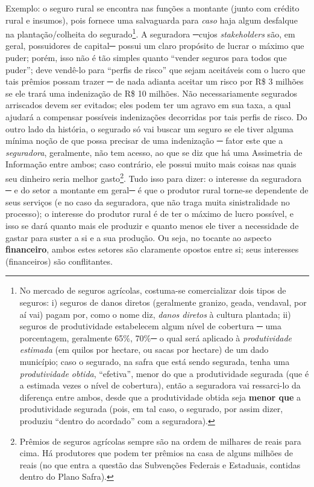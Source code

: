 \documentclass[12pt]{article}
\numberwithin{equation}{section}
\theoremstyle{plain}
\theoremstyle{definition}
\theoremstyle{remark}
\begin{document}
Exemplo: o seguro rural se encontra nas funções a montante (junto com crédito rural e insumos), pois fornece uma salvaguarda para \textit{caso} haja algum desfalque na plantação/colheita do segurado\footnote{No mercado de seguros agrícolas, costuma-se comercializar dois tipos de seguros: i) seguros de danos diretos (geralmente granizo, geada, vendaval, por aí vai) pagam por, como o nome diz, \textit{danos diretos} à cultura plantada; ii) seguros de produtividade estabelecem algum nível de cobertura ─ uma porcentagem, geralmente 65\%, 70\%─ o qual será aplicado à \textit{produtividade estimada} (em quilos por hectare, ou sacas por hectare) de um dado município; caso o segurado, na safra que está sendo segurada, tenha uma \textit{produtividade obtida}, ``efetiva'', menor do que a produtividade segurada (que é a estimada vezes o nível de cobertura), então a seguradora vai ressarci-lo da diferença entre ambos, desde que a produtividade obtida seja \textbf{menor que} a produtividade segurada (pois, em tal caso, o segurado, por assim dizer, produziu ``dentro do acordado'' com a seguradora).}. A seguradora ─cujos \textit{stakeholders} são, em geral, possuidores de capital─ possui um claro propósito de lucrar o máximo que puder; porém, isso não é tão simples quanto ``vender seguros para todos que puder''; deve vendê-lo para ``perfis de risco'' que sejam aceitáveis com o lucro que tais prêmios possam trazer ─ de nada adianta aceitar um risco por R\$ 3 milhões se ele trará uma indenização de R\$ 10 milhões. Não necessariamente segurados arriscados devem ser evitados; eles podem ter um agravo em sua taxa, a qual ajudará a compensar possíveis indenizações decorridas por tais perfis de risco. Do outro lado da história, o segurado só vai buscar um seguro se ele tiver alguma mínima noção de que possa precisar de uma indenização ─ fator este que a \textit{seguradora}, geralmente, não tem acesso, ao que se diz que há uma Assimetria de Informação entre ambos; caso contrário, ele possui muito mais coisas nas quais seu dinheiro seria melhor gasto\footnote{Prêmios de seguros agrícolas sempre são na ordem de milhares de reais para cima. Há produtores que podem ter prêmios na casa de alguns milhões de reais (no que entra a questão das Subvenções Federais e Estaduais, contidas dentro do Plano Safra).}. Tudo isso para dizer: o interesse da seguradora ─ e do setor a montante em geral─ é que o produtor rural torne-se dependente de seus serviços (e no caso da seguradora, que não traga muita sinistralidade no processo); o interesse do produtor rural é de ter o máximo de lucro possível, e isso se dará quanto mais ele produzir e quanto menos ele tiver a necessidade de gastar para suster a si e a sua produção. Ou seja, no tocante ao aspecto \textbf{financeiro}, ambos estes setores são claramente opostos entre si; seus interesses (financeiros) são conflitantes.
\end{document}
